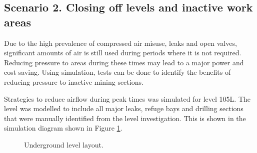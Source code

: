 	\subsection{Scenario 2. Closing off levels and inactive work areas}
	Due to the high prevalence of compressed air misuse, leaks and open valves, significant amounts of air is still used during periods where it is not required. Reducing pressure to areas during these times may lead to a major power and cost saving. Using simulation, tests can be done to identify the benefits of reducing pressure to inactive mining sections.
	\par 
	Strategies to reduce airflow during peak times was simulated for level 105L. The level was modelled to include all major leaks, refuge bays and drilling sections that were manually identified from the level investigation. This is shown in the simulation diagram shown in Figure \ref{fig: KUS Simulation level layout}. 
	\begin{figure}[h!]
		\centering
		\caption{Underground level layout.}
		\label{fig: KUS Simulation level layout}
	\end{figure}	
